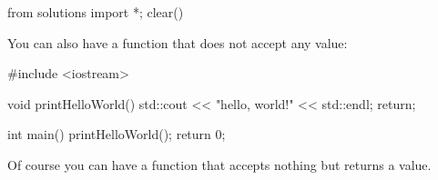 \begin{python0}
from solutions import *; clear()
\end{python0}

You can also have a function that does not accept any value:

\begin{consolethree}[escapeinside=||]
#include <iostream>

void printHelloWorld()
{
    std::cout << "hello, world!" << std::endl;
    return;
}

int main()
{
    printHelloWorld();
    return 0;
}
\end{consolethree}

Of course you can have a function that accepts nothing but returns a value.



